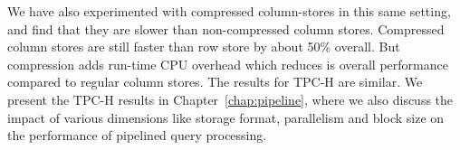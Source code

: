 We have also experimented with compressed column-stores in this same setting, and find that they are slower than non-compressed column stores. Compressed column stores are still faster than row store by about 50\% overall. But compression adds run-time CPU overhead which reduces is overall performance compared to regular column stores. 
The results for TPC-H are similar. 
We present the TPC-H results in Chapter~\ref{chap:pipeline}, where we also discuss the impact of various dimensions like storage format, parallelism and block size on the performance of pipelined query processing.




